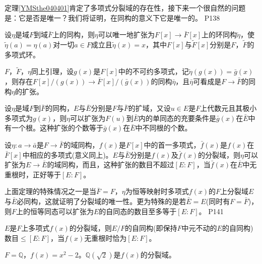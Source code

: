 \original
{
	定理\ref{YMSthe040401}肯定了多项式分裂域的存在性，接下来一个很自然的问题是：它是否是唯一？我们将证明，在同构的意义下它是唯一的。
}
{P138}

\begin{lemma}
	设$\eta$是域$F$到域$\bar{F}$上的同构，则$\eta$可以唯一地扩张为$F[x]\rightarrow \bar{F}[x]$上的环同构$\tilde{\eta}$，使$\tilde{\eta}(a)=\eta(a)$对一切$a\in F$成立且$\tilde{\eta}(x)=x$，其中$F[x]$与$\tilde{F}[x]$分别是$F$，$\tilde{F}$的多项式环。
\end{lemma}

\begin{lemma}
	$F$，$\tilde{F}$，$\eta$同上引理，设$g(x)$是$F[x]$中的不可约多项式，记$\tilde{\eta}(g(x))=\bar{g}(x)$，则存在$F[x]/(g(x))\rightarrow \bar{F}[x]/(\bar{g}(x))$的同构$\bar{\eta}$，且$\bar{\eta}$可看成是$F\rightarrow \bar{F}$的同构$\eta$的扩张。
\end{lemma}


\begin{lemma}
	设$\eta$是域$F$到$\bar{F}$的同构，$E$与$\bar{E}$分别是$F$与$\bar{F}$的扩域，又设$u\in E$是$F$上代数元且其极小多项式为$g(x)$，则$\eta$可以扩张为$F(u)$到$\bar{E}$内的单同态的充要条件是$\bar{g}(x)$在$\bar{E}$中有一个根。这种扩张的个数等于$\bar{g}(x)$在$\bar{E}$中不同根的个数。
\end{lemma}


\begin{theorem}\label{YMSthe040402}
	设$\eta :a\rightarrow \bar{a}$是$F\rightarrow\bar{F}$的域同构，$f(x)$是$F[x]$中的首一多项式，$\bar{f}(x)$是$f(x)$在$\bar{F}[x]$中相应的多项式(意义同上)。$E$与$\bar{E}$分别是$f(x)$及$\bar{f}(x)$的分裂域，则$\eta$可以扩张为$E \rightarrow\bar{E}$的域同构，而且，这种扩张的数目不超过$[E:F]$，当$\bar{f}(x)$在$\bar{E}$中无重根时，正好等于$[E:F]$。
\end{theorem}

\original
{
	上面定理的特殊情况之一是当$\bar{F}=F$，$\eta$为恒等映射时多项式$f(x)$的$F$上分裂域$E$与$\bar{E}$必同构，这就证明了分裂域的唯一性。更为特殊的是若$\bar{E}=E$(同时有$F=\bar{F}$)，则$F$上的恒等同态可以扩张为$E$的自同态的数目至多等于$[E:F]$。
}
{P141}

\begin{theorem}
	$E$是$F$上多项式$f(x)$的分裂域，则$E/F$的自同构(即保持$F$中元不动的$E$的自同构)数目$\leq [E:F]$，当$f(x)$无重根时恰为$[E:F]$。
\end{theorem}



\begin{example}
	$F=\mathbb{Q}$，$f(x)=x^{2}-2$。$\mathbb{Q}(\sqrt{2})$是$f(x)$的分裂域。
\end{example}

